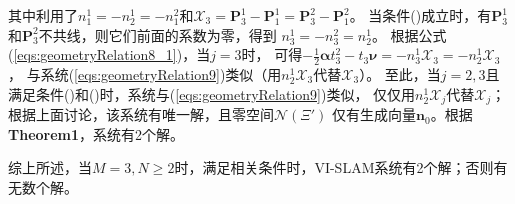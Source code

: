 \documentclass{article}
\begin{document}
其中利用了$n_1^1=-n_2^1=-n_1^2$和$\mathcal{X}_3=\textbf{P}_3^1-\textbf{P}_1^1=\textbf{P}_3^2-\textbf{P}_1^2$。
当条件()成立时，有$\textbf{P}_3^1$和$\textbf{P}_3^2$不共线，则它们前面的系数为零，得到
$n_3^1=-n_3^2=n_2^1$。
根据公式(\ref{eqs:geometryRelation8_1})，当$j=3$时，
可得$-\frac{1}{2}\mathbf{\alpha}t_3^2-t_3\mathbf{\nu}=-n_3^1\mathcal{X}_3=-n_2^1\mathcal{X}_3$，
与系统(\ref{eqs:geometryRelation9})类似（用$n_2^1\mathcal{X}_3$代替$\mathcal{X}_3$）。
至此，当$j=2,3$且满足条件()和()时，系统与(\ref{eqs:geometryRelation9})类似，
仅仅用$n_2^1\mathcal{X}_j$代替$\mathcal{X}_j$；根据上面讨论，该系统有唯一解，且零空间$\mathcal{N}(\Xi')$
仅有生成向量$\textbf{n}_0$。根据\textbf{Theorem1}，系统有2个解。
\par
综上所述，当$M=3,N\geqslant 2$时，满足相关条件时，VI-SLAM系统有2个解；否则有无数个解。
\end{document}
